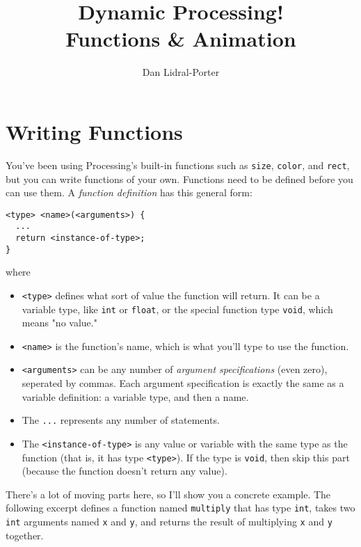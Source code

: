 \documentclass[
]{leaflet}
\title{\vspace{-1.5em}Dynamic Processing!\\
Functions \& Animation\vspace{-2ex}}
\author{%
  Dan Lidral-Porter\vspace{-2ex}
}
\date{}
\begin{document}


\maketitle
\thispagestyle{empty}


\vspace{-2em}

\section{Writing Functions}

You've been using Processing's built-in functions such as \texttt{size}, \texttt{color}, and \texttt{rect}, but you can write functions of your own.
Functions need to be defined before you can use them.
A \textit{function definition} has this general form:

\begin{lstlisting}
<type> <name>(<arguments>) {
  ...
  return <instance-of-type>;
}
\end{lstlisting}
\vspace{-0.5em}
where
\begin{itemize}
  \item \texttt{<type>} defines what sort of value the function will return.
        It can be a variable type, like \texttt{int} or \texttt{float}, or the special function type \texttt{void}, which means "no value."
  \item \texttt{<name>} is the function's name, which is what you'll type to use the function.
  \item \texttt{<arguments>} can be any number of \textit{argument specifications} (even zero), seperated by commas.
        Each argument specification is exactly the same as a variable definition: a variable type, and then a name.
  \item The \texttt{...} represents any number of statements.
  \item The \texttt{<instance-of-type>} is any value or variable with the same type as the function (that is, it has type \texttt{<type>}).
        If the type is \texttt{void}, then skip this part (because the function doesn't return any value).
\end{itemize}

There's a lot of moving parts here, so I'll show you a concrete example.
The following excerpt defines a function named \texttt{multiply} that has type \texttt{int}, takes two \texttt{int} arguments named \texttt{x} and \texttt{y}, and returns the result of multiplying \texttt{x} and \texttt{y} together.
\end{document}
